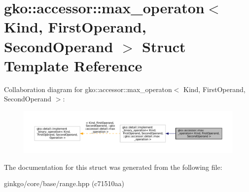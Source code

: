 \hypertarget{structgko_1_1accessor_1_1max__operaton}{}\section{gko\+:\+:accessor\+:\+:max\+\_\+operaton$<$ Kind, First\+Operand, Second\+Operand $>$ Struct Template Reference}
\label{structgko_1_1accessor_1_1max__operaton}


Collaboration diagram for gko\+:\+:accessor\+:\+:max\+\_\+operaton$<$ Kind, First\+Operand, Second\+Operand $>$\+:
\nopagebreak
\begin{figure}[H]
\begin{center}
\leavevmode
\includegraphics[width=350pt]{structgko_1_1accessor_1_1max__operaton__coll__graph}
\end{center}
\end{figure}


The documentation for this struct was generated from the following file\+:\begin{DoxyCompactItemize}
\item 
ginkgo/core/base/range.\+hpp (c71510aa)\end{DoxyCompactItemize}
